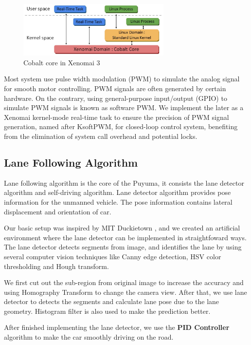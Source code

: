 \documentclass[conference]{IEEEtran}
\begin{document}
\FloatBarrier
\begin{figure}
	\centering
	\includegraphics[width=3in]{img/xeno_arch.jpg}
	\caption{Cobalt core in Xenomai 3}
	\label{fig:xeno_arch}
\end{figure}

Most system use pulse width modulation (PWM) to simulate the analog signal for smooth motor controlling. PWM signals are often generated by certain hardware. On the contrary, using general-purpose input/output (GPIO) to simulate PWM signals is known as software PWM. We implement the later as a Xenomai kernel-mode real-time task to ensure the precision of PWM signal generation, named after KsoftPWM, for closed-loop control system, benefiting from the elimination of system call overhead and potential locks.

\subsection{Lane Following Algorithm}

Lane following algorithm is the core of the Puyuma, it consists the lane detector algorithm and self-driving algorithm. Lane detector algorithm provides pose information for the unmanned vehicle. The pose information contains lateral displacement and orientation of car.

Our basic setup was inspired by MIT Duckietown \cite{Duckietown}, and we created an artificial environment where the lane detector can be implemented in straightfoward ways. The lane detector detects segments from image, and identifies the lane by using several computer vision techniques like Canny edge detection, HSV color thresholding and Hough transform.

We first cut out the sub-region from original image to increase the accuracy and using Homography Transform to change the camera view. After that, we use lane detector to detects the segments and calculate lane pose due to the lane geometry. Histogram filter is also used to make the prediction better. 

After finished implementing the lane detector, we use the \textbf{PID Controller} algorithm to make the car smoothly driving on the road.
\end{document}
